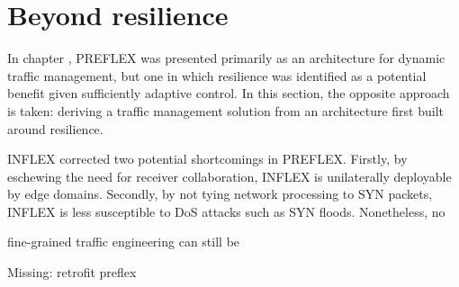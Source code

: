 \section{Beyond resilience}

In chapter \label{chapter:preflex}, \ac{PREFLEX} was presented primarily as an architecture for dynamic traffic management, but one in which resilience was identified as a potential benefit given sufficiently adaptive control.
In this section, the opposite approach is taken: deriving a traffic management solution from an architecture first built around resilience.

INFLEX corrected two potential shortcomings in PREFLEX.
Firstly, by eschewing the need for receiver collaboration, INFLEX is unilaterally deployable by edge domains.
Secondly, by not tying network processing to SYN packets, INFLEX is less susceptible to \ac{DoS} attacks such as SYN floods.
Nonetheless, no 

fine-grained traffic engineering can still be 

{\COMMENT Missing: retrofit preflex}

